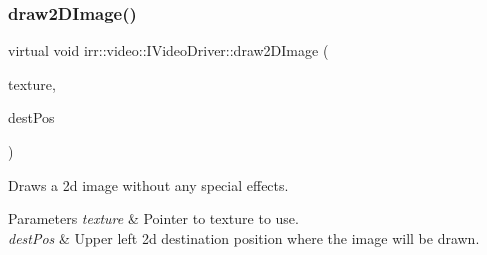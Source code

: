 \subsubsection{\texorpdfstring{draw2\+D\+Image()}{draw2DImage()}\hspace{0.1cm}{\footnotesize\ttfamily [2/6]}}
{\footnotesize\ttfamily virtual void irr\+::video\+::\+I\+Video\+Driver\+::draw2\+D\+Image (\begin{DoxyParamCaption}\item[{const \hyperlink{classirr_1_1video_1_1ITexture}{video\+::\+I\+Texture} $\ast$}]{texture,  }\item[{const core\+::position2d$<$ \hyperlink{namespaceirr_ac66849b7a6ed16e30ebede579f9b47c6}{s32} $>$ \&}]{dest\+Pos }\end{DoxyParamCaption})\hspace{0.3cm}{\ttfamily [pure virtual]}}



Draws a 2d image without any special effects. 


\begin{DoxyParams}{Parameters}
{\em texture} & Pointer to texture to use. \\
\hline
{\em dest\+Pos} & Upper left 2d destination position where the image will be drawn. \\
\hline
\end{DoxyParams}
\mbox{\label{classirr_1_1video_1_1IVideoDriver_a167d3a5e2ea5804bfa9ba9e526bbcdb3}} 
